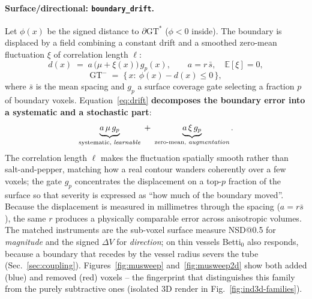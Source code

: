 \documentclass[
    bookmarks, bookmarksnumbered, bookmarksopen,
    colorlinks=true, citecolor=blue, linkcolor=blue, urlcolor=blue
]{techrep}
\newcommand{\gtstar}{\ensuremath{\mathrm{GT}^{\!*}}}
\newcommand{\gtminus}{\ensuremath{\mathrm{GT}^{\!-}}}
\newcommand{\E}{\ensuremath{\mathbb{E}}}
\begin{document}
\paragraph{Surface/directional: \texttt{boundary\_drift}.} Let
$\phi(x)$ be the signed distance to $\partial\gtstar$ ($\phi<0$ inside). The boundary
is displaced by a field combining a constant drift and a smoothed zero-mean
fluctuation $\xi$ of correlation length $\ell$:
\begin{equation}
  d(x) \;=\; a\,\big(\mu + \xi(x)\big)\,g_p(x),
  \qquad a = r\,\bar{s},\quad \E[\xi]=0,
  \label{eq:drift}
\end{equation}
\begin{equation}
  \gtminus \;=\; \{\,x:\ \phi(x)-d(x)\le 0\,\},
\end{equation}
where $\bar s$ is the mean spacing and $g_p$ a surface coverage gate selecting a
fraction $p$ of boundary voxels. Equation~\eqref{eq:drift} \textbf{decomposes the
boundary error into a systematic and a stochastic part}:
\begin{equation}
  \underbrace{a\,\mu\,g_p}_{\text{systematic, \emph{learnable}}}
  \;+\;
  \underbrace{a\,\xi\,g_p}_{\text{zero-mean, \emph{augmentation}}}.
\end{equation}
The correlation length $\ell$ makes the fluctuation spatially smooth rather than
salt-and-pepper, matching how a real contour wanders coherently over a few voxels; the gate
$g_p$ concentrates the displacement on a top-$p$ fraction of the surface so that severity is
expressed as ``how much of the boundary moved''. Because the displacement is measured in
millimetres through the spacing ($a=r\bar s$), the same $r$ produces a physically comparable
error across anisotropic volumes. The matched instruments are the sub-voxel surface measure
NSD@0.5 for \emph{magnitude} and the signed $\Delta V$ for \emph{direction}; on thin vessels
Betti$_0$ also responds, because a boundary that recedes by the vessel radius severs the tube
(Sec.~\ref{sec:coupling}). Figures~\ref{fig:musweep} and~\ref{fig:musweep2d} show both added
(blue) and removed (red) voxels -- the fingerprint that distinguishes this family from the
purely subtractive ones (isolated 3D render in Fig.~\ref{fig:ind3d-families}).
\end{document}
